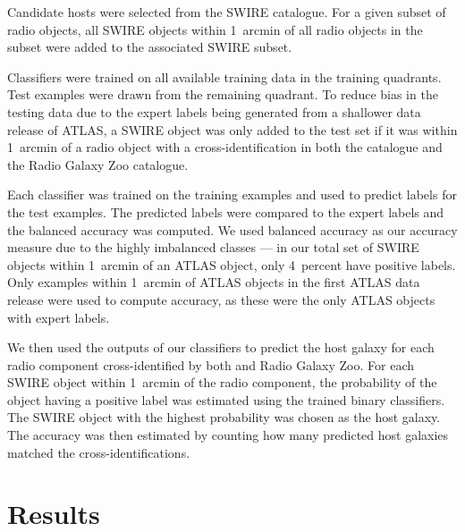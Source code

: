 \documentclass[fleqn,usenatbib,usedcolumn]{mnras}
\begin{document}
    Candidate hosts were selected from the SWIRE catalogue. For a given subset
    of radio objects, all SWIRE objects within 1~arcmin of all radio objects in
    the subset were added to the associated SWIRE subset.

    Classifiers were trained on all available training data in the training
    quadrants. Test examples were drawn from the remaining quadrant. To reduce
    bias in the testing data due to the expert labels being generated from a
    shallower data release of ATLAS, a SWIRE object was only added to the test
    set if it was within 1~arcmin of a radio object with a cross-identification
    in both the \citet{norris06} catalogue and the Radio Galaxy Zoo catalogue.

    Each classifier was trained on the training examples and used to predict
    labels for the test examples. The predicted labels were compared to the
    expert labels and the balanced accuracy was computed. We used balanced
    accuracy as our accuracy measure due to the highly imbalanced classes --- in
    our total set of SWIRE objects within 1~arcmin of an ATLAS object, only
    4~percent have positive labels. Only examples within 1~arcmin of ATLAS
    objects in the first ATLAS data release \citep{norris06} were used to
    compute accuracy, as these were the only ATLAS objects with expert labels.

    We then used the outputs of our classifiers to predict the host galaxy for
    each radio component cross-identified by both \citet{norris06} and Radio
    Galaxy Zoo. For each SWIRE object within 1~arcmin of the radio component,
    the probability of the object having a positive label was estimated using
    the trained binary classifiers. The SWIRE object with the highest
    probability was chosen as the host galaxy. The accuracy was then estimated
    by counting how many predicted host galaxies matched the \citet{norris06}
    cross-identifications.

\section{Results}\label{sec:results}
\end{document}

